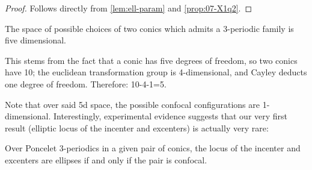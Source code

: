 \begin{proof}
Follows directly from  \cref{lem:ell-param} and  \cref{prop:07-X1q2}.
\end{proof}

\begin{remark}
The space of possible choices of two conics which admits a 3-periodic family is five dimensional.
\end{remark}

This stems from the fact that a conic has five degrees of freedom, so two conics have 10; the euclidean transformation group is 4-dimensional, and Cayley deducts one degree of freedom. Therefore: 10-4-1=5.

Note that over said 5d space, the possible confocal configurations are 1-dimensional. Interestingly, experimental evidence suggests that our very first result (elliptic locus of the incenter and excenters) is actually very rare:

\begin{conjecture}
Over Poncelet 3-periodics in a given pair of conics, the locus of the incenter and excenters are ellipses if and only if the pair is confocal.
\label{conj:07-incenter-excenter-loci}
\end{conjecture}


